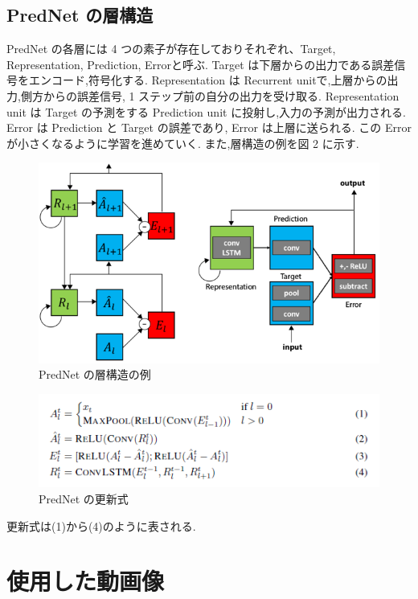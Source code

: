 \subsection{PredNet の層構造}
PredNet の各層には 4 つの素子が存在しておりそれぞれ、Target, Representation, Prediction, Errorと呼ぶ.
Target は下層からの出力である誤差信号をエンコード,符号化する.
Representation は Recurrent unitで,上層からの出力,側方からの誤差信号, 1 ステップ前の自分の出力を受け取る.
Representation unit は Target の予測をする Prediction unit に投射し,入力の予測が出力される.
Error は Prediction と Target の誤差であり, Error は上層に送られる.
この Error が小さくなるように学習を進めていく.
また,層構造の例を図 2 に示す.

 \begin{figure}[hb]
\includegraphics[scale=0.4]{prednet.png}
 \caption{PredNet の層構造の例}
\end{figure}
\begin{figure}[hb]
\includegraphics[scale=0.4]{DeepPrednet_formula.png}
 \caption{PredNet の更新式}
\end{figure}
更新式は(1)から(4)のように表される.

\section{使用した動画像}

